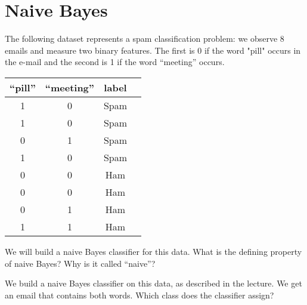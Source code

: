 \documentclass[11pt]{article}
\begin{document}
\section{Naive Bayes}

The following dataset represents a spam classification problem: we observe 8 emails and measure two binary features. The first is 0 if the word "pill" occurs in the e-mail and the second is 1 if the word ``meeting'' occurs. 

\begin{center}
	\begin{tabular}{c c c c}
		 ``pill'' &``meeting'' & label\\
		\hline
		  1 & 0 & Spam \\
		  1 & 0 & Spam \\
		  0 & 1 & Spam \\
		  1 & 0 & Spam \\
		  0 & 0 & Ham \\
		  0 & 0 & Ham \\
		  0 & 1 & Ham\\
		  1 & 1 & Ham \\
		\hline
	\end{tabular}
\end{center}

We will build a naive Bayes classifier for this data. What is the defining property of naive Bayes? Why is it called ``naive''?



We build a naive Bayes classifier on this data, as described in the lecture. We get an email that contains both words. Which class does the classifier assign?
\end{document}
